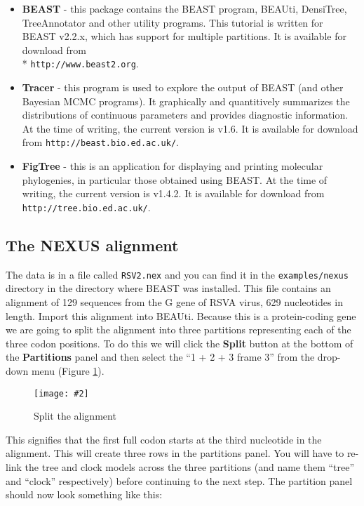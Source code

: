 \documentclass[12pt]{article}
\newcommand{\includeimage}[2][]{%
\texttt{[image: \#2]}
}
\newcommand{\BEASTVersion}{2.2.x}
\newcommand{\TracerVersion}{1.6}
\newcommand{\FigTreeVersion}{1.4.2}
\begin{document}
\begin{itemize}
\item {\bf BEAST} - this package contains the BEAST program, BEAUti, DensiTree, TreeAnnotator and other utility programs. This tutorial is written for BEAST v{\BEASTVersion}, which has support for multiple partitions. It is available for download from \\* \texttt{http://www.beast2.org}.
\item {\bf Tracer} - this program is used to explore the output of BEAST (and other Bayesian MCMC programs). It graphically and
quantitively summarizes the distributions of continuous parameters and provides diagnostic information. At the time of
writing, the current version is v{\TracerVersion}. It is available for download from \texttt{http://beast.bio.ed.ac.uk/}.
\item {\bf FigTree} - this is an application for displaying and printing molecular phylogenies, in particular those obtained using
BEAST. At the time of writing, the current version is v{\FigTreeVersion}. It is available for download from \texttt{http://tree.bio.ed.ac.uk/}.
\end{itemize}

\subsection*{The NEXUS alignment}
The data is in a file called \texttt{RSV2.nex} and you can find it in the {\tt examples/nexus} directory in the directory where BEAST was installed. This file contains an alignment of 129 sequences from the G gene of RSVA virus, 629 nucleotides in length. Import this alignment into BEAUti. Because this is a protein-coding gene we are going to split the alignment into three partitions representing each of the three codon positions. To do this we will click the {\bf Split} button at the bottom of the {\bf Partitions} panel and then select the ``1 + 2 + 3 frame 3'' from the drop-down menu (Figure \ref{fig:BEAUti_split}). 

\begin{figure}
\centering	
\includeimage[width=0.6\textwidth]{figures/BEAUti_split}
\label{fig:BEAUti_split}
\caption{Split the alignment}
\end{figure}

This signifies that the first full codon starts at the third nucleotide in the alignment. This will create three rows in the partitions panel. You will have to re-link the tree and clock models across the three partitions (and name them ``tree'' and ``clock'' respectively) before continuing to the next step. The partition panel should now look something like this:
\end{document}
